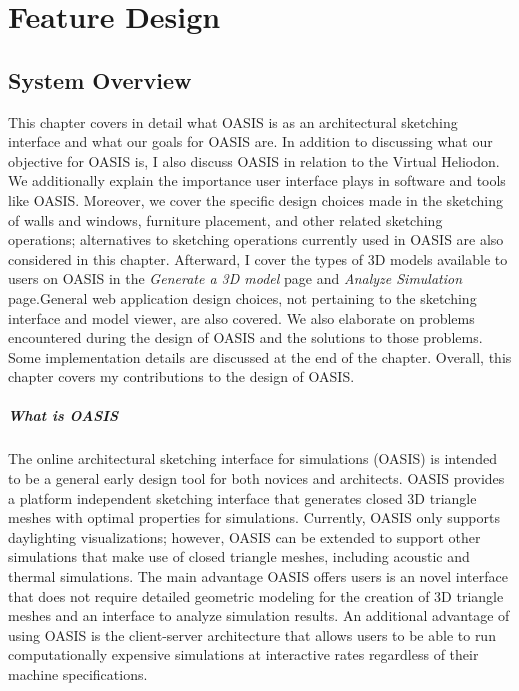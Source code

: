 \chapter{Feature Design} \label{sec:feature}

\section{System Overview}
This chapter covers in detail what OASIS is as an architectural sketching interface and what our goals for OASIS are. In addition to discussing what our objective for OASIS is, I also discuss OASIS in relation to the Virtual Heliodon. We additionally explain the importance user interface plays in software and tools like OASIS. Moreover, we cover the specific design choices made in the sketching of walls and windows, furniture placement, and other related sketching operations; alternatives to sketching operations  currently used in OASIS are also considered in this chapter.
Afterward, I cover the types of 3D models available to users on OASIS in the \textit{Generate a 3D model} page and \textit{Analyze Simulation} page.General web application design choices, not pertaining to the sketching interface and model viewer, are also covered. We also elaborate on problems encountered during the design of OASIS and the solutions to those problems. Some implementation details are discussed at the end of the chapter. Overall, this chapter covers my contributions to the design of OASIS.


\paragraph{What is OASIS}
The online architectural sketching interface for simulations (OASIS) is intended to be a  general early design tool for both novices and architects. OASIS provides a platform independent sketching interface that generates closed 3D triangle meshes with optimal properties for simulations. Currently, OASIS only supports daylighting visualizations; however, OASIS can be extended to support other simulations that make use of closed triangle meshes, including acoustic and thermal simulations. The main advantage OASIS offers users is an novel interface that does not require detailed geometric modeling for the creation of 3D triangle meshes and an interface to analyze simulation results. An additional advantage of using OASIS is the client-server architecture that allows users to be able to run computationally expensive simulations at interactive rates regardless of their machine specifications.

